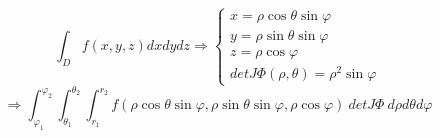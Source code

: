 	$$\int_D f(x,y,z)dxdydz \Rightarrow \begin{cases} x = \rho \cos \theta \sin \varphi \\ y = \rho \sin \theta \sin \varphi \\z=\rho \cos \varphi\\ detJ\Phi(\rho,\theta)=\rho^2 \sin \varphi \end{cases}$$
	$$\Rightarrow \int_{\varphi_1}^{\varphi_2}\int_{\theta_1}^{\theta_2}\int_{r_1}^{r_2}f(\rho \cos \theta \sin \varphi,\rho \sin \theta \sin \varphi, \rho \cos \varphi)\ detJ\Phi\  d\rho d\theta d\varphi$$
